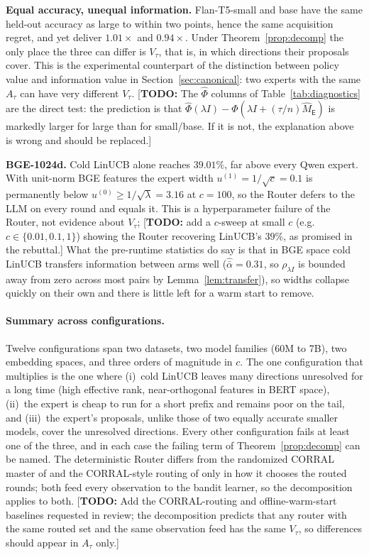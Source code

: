 \documentclass{article}
\theoremstyle{definition}
\theoremstyle{remark}
\theoremstyle{remark}
\newcommand{\todo}[1]{\textcolor{red!70!black}{[\textbf{TODO:} #1]}}
\newcommand{\Exp}{\mathsf{E}}
\begin{document}
\textbf{Equal accuracy, unequal information.} Flan-T5-small and base have the
same held-out accuracy as large to within two points, hence the same
acquisition regret, and yet deliver $1.01\times$ and $0.94\times$. Under
Theorem~\ref{prop:decomp} the only place the three can differ is
$V_\tau$, that is, in which directions their proposals cover. This is the
experimental counterpart of the distinction between policy value and
information value in Section~\ref{sec:canonical}: two experts with the same
$A_\tau$ can have very different $V_\tau$. \todo{The $\widehat\Phi$ columns
of Table~\ref{tab:diagnostics} are the direct test: the prediction is that
$\widehat\Phi(\lambda I)-\widehat\Phi(\lambda I+(\tau/n)\widehat M_{\Exp})$ is
markedly larger for large than for small/base. If it is not, the explanation
above is wrong and should be replaced.}

\textbf{BGE-1024d.} Cold LinUCB alone reaches $39.01\%$, far above every Qwen
expert. With unit-norm BGE features the expert width $u^{(1)}=1/\sqrt c=0.1$
is permanently below $u^{(0)}\ge1/\sqrt\lambda=3.16$ at $c=100$, so the Router
defers to the LLM on every round and equals it. This is a hyperparameter
failure of the Router, not evidence about $V_\tau$; \todo{add a $c$-sweep at
small $c$ (e.g.\ $c\in\{0.01,0.1,1\}$) showing the Router recovering LinUCB's
$39\%$, as promised in the rebuttal.} What the pre-runtime statistics do say
is that in BGE space cold LinUCB transfers information between arms well
($\widehat{\bar\alpha}=0.31$, so $\rho_{\lambda I}$ is bounded away from zero
across most pairs by Lemma~\ref{lem:transfer}), so widths collapse quickly on
their own and there is little left for a warm start to remove.

\paragraph{Summary across configurations.}
Twelve configurations span two datasets, two model families (60M to 7B), two
embedding spaces, and three orders of magnitude in $c$. The one configuration
that multiplies is the one where (i)~cold LinUCB leaves many directions
unresolved for a long time (high effective rank, near-orthogonal features in
BERT space), (ii)~the expert is cheap to run for a short prefix and remains
poor on the tail, and (iii)~the expert's proposals, unlike those of two
equally accurate smaller models, cover the unresolved directions. Every other
configuration fails at least one of the three, and in each case the failing
term of Theorem~\ref{prop:decomp} can be named. The deterministic Router
differs from the randomized CORRAL master of \cite{agarwal2017corralling} and
the CORRAL-style routing of \cite{chen2024llmdecision} only in how it chooses
the routed rounds; both feed every observation to the bandit learner, so the
decomposition applies to both. \todo{Add the CORRAL-routing and
offline-warm-start baselines requested in review; the decomposition predicts
that any router with the same routed set and the same observation feed has
the same $V_\tau$, so differences should appear in $A_\tau$ only.}
\end{document}
